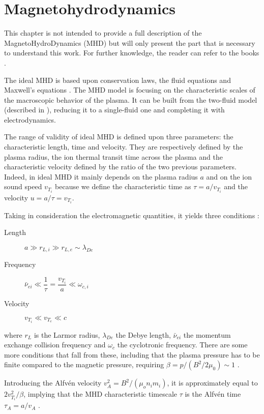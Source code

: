 \chapter{Magnetohydrodynamics}\label{sec:MHD}\thispagestyle{fancy}
This chapter is not intended to provide a full description of the MagnetoHydroDynamics (MHD) but will only present the part that is necessary to understand this work. For further knowledge, the reader can refer to the books \cite{freidberg,freidberg2,boyd-sanderson,wesson}.

The ideal MHD is based upon conservation laws, the fluid equations and Maxwell's equations \cite{freidberg}. The MHD model is focusing on the characteristic scales of the macroscopic behavior of the plasma. It can be built from the two-fluid model (described in \cite{freidberg}), reducing it to a single-fluid one and completing it with electrodynamics.

The range of validity of ideal MHD is defined upon three parameters: the characteristic length, time and velocity. They are respectively defined by the plasma radius, the ion thermal transit time across the plasma and the characteristic velocity defined by the ratio of the two previous parameters. Indeed, in ideal MHD it mainly depends on the plasma radius $a$ and on the ion sound speed $v_{T_i}$ because we define the characteristic time as $\tau = a / v_{T_i}$ and the velocity $u = a / \tau = v_{T_i}$.

Taking in consideration the electromagnetic quantities, it yields three conditions \cite{freidberg}:
\begin{description}
	\item[Length]    $a \gg r_{L,i} \gg r_{L,e} \sim \lambda_{De}$
	\item[Frequency] $\bar{\nu}_{ei} \ll \dfrac{1}{\tau} = \dfrac{v_{T_i}}{a} \ll \omega_{c,i}$
	\item[Velocity]  $v_{T_i} \ll v_{T_e} \ll c$
\end{description}
where $r_L$ is the Larmor radius, $\lambda_{De}$ the Debye length, $\bar{\nu}_{ei}$ the momentum exchange collision frequency and $\omega_c$ the cyclotronic frequency. There are some more conditions that fall from these, including that the plasma pressure has to be finite compared to the magnetic pressure, requiring $\beta = p / ( B^2 / 2 \mu_0 ) \sim 1$ \cite{freidberg}.

Introducing the Alfv\'en velocity $v_A^2 = B^2 / ( \mu_o n_i m_i )$, it is approximately equal to $2 v_{T_i}^2 / \beta$, implying that the MHD characteristic timescale $\tau$ is the Alfv\'en time $\tau_A = a / v_A$ \cite{boyd-sanderson}.

